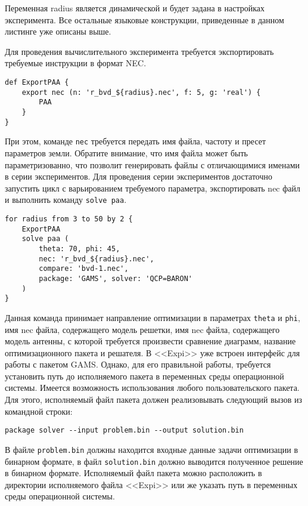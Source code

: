 Переменная radius является динамической и будет задана в настройках эксперимента. Все остальные языковые конструкции, приведенные в данном листинге уже описаны выше.

Для проведения вычислительного эксперимента требуется экспортировать требуемые инструкции в формат NEC.

\begin{lstlisting}
def ExportPAA {
    export nec (n: 'r_bvd_${radius}.nec', f: 5, g: 'real') {
        PAA
    }
}
\end{lstlisting}

При этом, команде \lstinline$nec$ требуется передать имя файла, частоту и пресет параметров земли. Обратите внимание, что имя файла может быть параметризованно, что позволит генерировать файлы с отличающимися именами в серии экспериментов. Для проведения серии экспериментов достаточно запустить цикл с варьированием требуемого параметра, экспортировать nec файл и выполнить команду \lstinline$solve paa$.

\begin{lstlisting}
for radius from 3 to 50 by 2 {
    ExportPAA
    solve paa (
        theta: 70, phi: 45,
        nec: 'r_bvd_${radius}.nec',
        compare: 'bvd-1.nec',
        package: 'GAMS', solver: 'QCP=BARON'
    )
}
\end{lstlisting}

Данная команда принимает направление оптимизации в параметрах \lstinline$theta$ и \lstinline$phi$, имя nec файла, содержащего модель решетки, имя nec файла, содержащего модель антенны, с которой требуется произвести сравнение диаграмм, название оптимизационного пакета и решателя. В <<Expi>> уже встроен интерфейс для работы с пакетом GAMS. Однако, для его правильной работы, требуется установить путь до исполняемого пакета в переменных среды операционной системы. Имеется возможность использования любого пользовательского пакета. Для этого, исполняемый файл пакета должен реализовывать следующий вызов из командной строки:

\begin{lstlisting}
package solver --input problem.bin --output solution.bin
\end{lstlisting}

В файле \lstinline$problem.bin$ должны находится входные данные задачи оптимизации в бинарном формате, в файл \lstinline$solution.bin$ должно выводится полученное решение в бинарном формате. Исполняемый файл пакета можно расположить в директории исполняемого файла <<Expi>> или же указать путь в переменных среды операционной системы.

